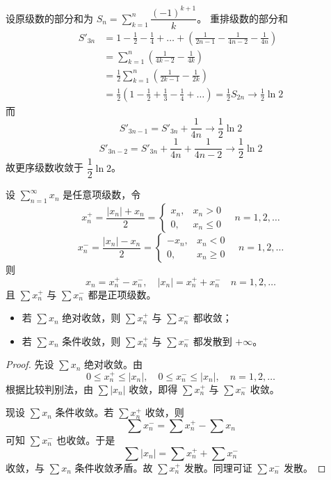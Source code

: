 \begin{solution}
	设原级数的部分和为 $S_n = \sum\limits_{k=1}^{n} \dfrac{(-1)^{k+1}}{k}$。
	重排级数的部分和
	\[
	\begin{aligned}
		S'_{3n} &= 1 - \frac{1}{2} - \frac{1}{4} + \dots + \left( \frac{1}{2n-1} - \frac{1}{4n-2} - \frac{1}{4n} \right) \\
		&= \sum_{k=1}^{n} \left( \frac{1}{4k-2} - \frac{1}{4k} \right) \\
		&= \frac{1}{2} \sum_{k=1}^{n} \left( \frac{1}{2k-1} - \frac{1}{2k} \right) \\
		&= \frac{1}{2} \left( 1 - \frac{1}{2} + \frac{1}{3} - \frac{1}{4} + \dots \right) = \frac{1}{2} S_{2n} \to \frac{1}{2} \ln 2
	\end{aligned}
	\]
	而
	\[
	S'_{3n-1} = S'_{3n} + \frac{1}{4n} \to \frac{1}{2} \ln 2
	\]
	\[
	S'_{3n-2} = S'_{3n} + \frac{1}{4n} + \frac{1}{4n-2} \to \frac{1}{2} \ln 2
	\]
	故更序级数收敛于 $\dfrac{1}{2} \ln 2$。
\end{solution}

\begin{definition}
	设 $\sum\limits_{n=1}^{\infty} x_n$ 是任意项级数，令
	\[
	x_n^+ = \frac{|x_n| + x_n}{2} =
	\begin{cases}
		x_n, & x_n > 0 \\
		0, & x_n \le 0
	\end{cases}
	\quad n=1,2,\dots
	\]
	\[
	x_n^- = \frac{|x_n| - x_n}{2} =
	\begin{cases}
		-x_n, & x_n < 0 \\
		0, & x_n \ge 0
	\end{cases}
	\quad n=1,2,\dots
	\]
	则
	\[
	x_n = x_n^+ - x_n^-, \quad |x_n| = x_n^+ + x_n^- \quad n=1,2,\dots
	\]
	且 $\sum x_n^+$ 与 $\sum x_n^-$ 都是正项级数。
\end{definition}
\begin{proposition}\label{ 绝对收敛}
	\begin{itemize}
		\item 若 $\sum x_n$ 绝对收敛，则 $\sum x_n^+$ 与 $\sum x_n^-$ 都收敛；
		\item 若 $\sum x_n$ 条件收敛，则 $\sum x_n^+$ 与 $\sum x_n^-$ 都发散到 $+\infty$。
	\end{itemize}

\end{proposition}
\begin{proof}
	先设 $\sum x_n$ 绝对收敛。由
	\[
	0 \le x_n^+ \le |x_n|, \quad 0 \le x_n^- \le |x_n|, \quad n=1,2,\dots
	\]
	根据比较判别法，由 $\sum |x_n|$ 收敛，即得 $\sum x_n^+$ 与 $\sum x_n^-$ 收敛。
	
	现设 $\sum x_n$ 条件收敛。若 $\sum x_n^+$ 收敛，则
	\[
	\sum x_n^- = \sum x_n^+ - \sum x_n
	\]
	可知 $\sum x_n^-$ 也收敛。于是
	\[
	\sum |x_n| = \sum x_n^+ + \sum x_n^-
	\]
	收敛，与 $\sum x_n$ 条件收敛矛盾。故 $\sum x_n^+$ 发散。同理可证 $\sum x_n^-$ 发散。
\end{proof}

